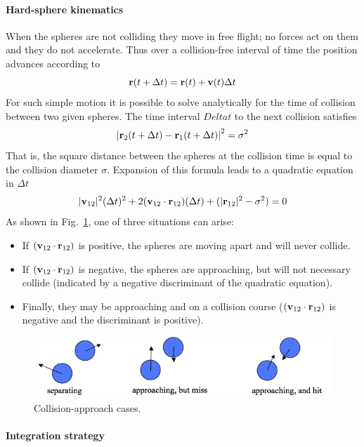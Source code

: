 \documentclass[]{article}
\let\oldparagraph\paragraph
\renewcommand{\paragraph}[1]{\oldparagraph{#1}\mbox{}}
\begin{document}
\paragraph{Hard-sphere kinematics}\label{hard-sphere-kinematics}

When the spheres are not colliding they move in free flight; no forces
act on them and they do not accelerate. Thus over a collision-free
interval of time the position advances according to
\[{\bf{r}}(t + \Delta t) = {\bf{r}}(t) + {\bf{v}}(t)\Delta t\]
For such simple motion it is possible to solve analytically for the time
of collision between two given spheres. The time interval $Delta t$ to the next
collision satisfies
\[{\left| {{{\bf{r}}_2}(t + \Delta t) - {{\bf{r}}_1}(t + \Delta t)} \right|^2} = {\sigma ^2}\]
That is, the square distance between the spheres at the collision time
is equal to the collision diameter $\sigma$. Expansion of this formula leads to
a quadratic equation in $\Delta t$
\[|{{\bf{v}}_{12}}{|^2}{(\Delta t)^2} + 2({{\bf{v}}_{12}} \cdot {{\bf{r}}_{12}})(\Delta t) + (|{{\bf{r}}_{12}}{|^2} - {\sigma ^2}) = 0\]
As shown in Fig.~\ref{fig:approaches}, one of three situations can arise:

\begin{itemize}
\item If $({\bf v}_{12}\cdot {\bf r}_{12})$ is positive, the spheres are moving apart and will never collide. 
\item If $({\bf v}_{12}\cdot {\bf r}_{12})$ is negative, the spheres are approaching, but will not necessary collide
(indicated by a negative discriminant of the quadratic equation).
\item Finally, they may be approaching and on a collision course ($({\bf v}_{12}\cdot {\bf r}_{12})$ is negative
and the discriminant is positive).
\end{itemize}

\begin{figure}
  \centering
  \includegraphics[width=\textwidth]{HSMD_figures/image030}
  \caption{\label{fig:approaches}Collision-approach cases.}
\end{figure}


\paragraph{Integration strategy}\label{integration-strategy}
\end{document}
